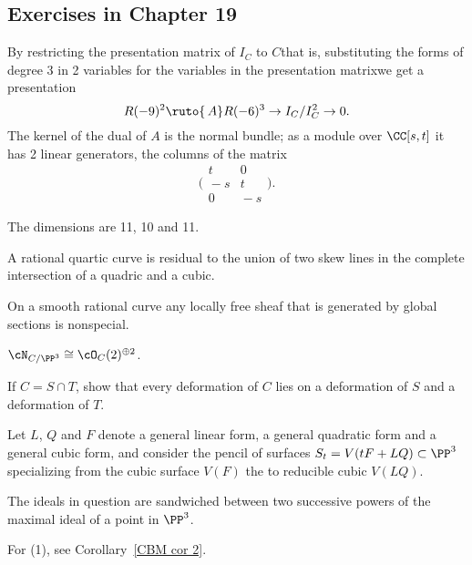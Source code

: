\goodbreak

\subsection*{Exercises in Chapter 19}

By
restricting the presentation matrix of $I_C$ to $C$\emdash that is,
sub\-sti\-tuting the forms of degree 3 in 2 variables for the variables in
the presentation \null matrix\emdash we get a presentation
$$
R(-9)^2 \ruto {\,A} R(-6)^3 \to I_C/I_C^2 \to 0
.
$$
The kernel of the dual of $A$ is the normal bundle; 
as a module over $\CC[s,t]$ it has 2 linear
generators, the columns of the matrix
$$
\biggl(
\begin{smallmatrix}
t&0\\[2pt]
\!-s&t\\[2pt]
0&\!-s
\end{smallmatrix}
\biggr).
$$

The dimensions are 11, 10 and 11.

A rational quartic curve is residual to the union of two skew
lines in the complete intersection of a quadric and a cubic.

On a smooth rational curve any locally free sheaf that is generated
by global sections is nonspecial.

$\cN_{C/\PP^3} \cong \cO_C(2)^{\oplus 2}$.

If $C = S \cap T$, show that every deformation of $C$ lies on a
deformation of $S$ and a deformation of $T$.

Let $L$, $Q$ and $F$ denote a general linear form,
a general quadratic form and a general cubic form, and consider the
pencil of surfaces $S_t = V(tF + LQ) \subset \PP^3$ specializing from
the cubic surface $V(F)$ the to reducible cubic $V(LQ)$.

The ideals in question are sandwiched between two successive powers
of the maximal ideal of a point in $\PP^3$.

For (1), see Corollary~\ref{CBM cor 2}.


